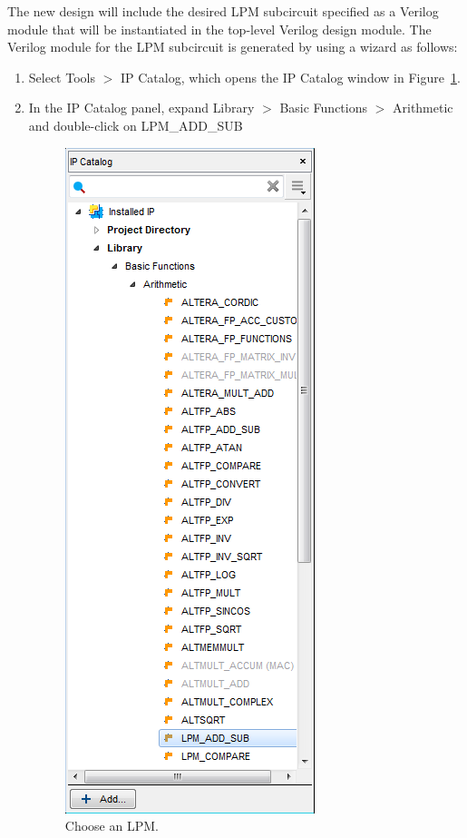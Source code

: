 \documentclass[11pt, twoside, pdftex]{article}
\begin{document}
The new design will include the desired LPM subcircuit specified as a Verilog 
module that will be instantiated in the top-level Verilog design module.
The Verilog module for the LPM subcircuit is generated by using a wizard as
follows:
\begin{enumerate}
\item Select {\sf Tools $>$ IP Catalog}, which
opens the IP Catalog window in Figure~\ref{fig:4}.
\item In the IP Catalog panel, expand {\sf Library $>$ Basic Functions $>$ Arithmetic} and double-click on {\sf LPM\_ADD\_SUB }


\begin{figure}[H]
   \begin{center}
      \includegraphics[scale=0.65]{figures/figure4.png}
   \caption{Choose an LPM.} 
	 \label{fig:4}
	 \end{center}
\end{figure} 
 

\end{enumerate}
\end{document}
